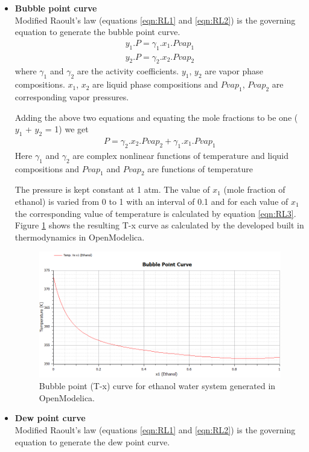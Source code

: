 \documentclass[12pt]{report}
\begin{document}
\begin{itemize}
\item {\textbf{Bubble point curve}} \\
Modified Raoult's law (equations \ref{eqn:RL1} and \ref{eqn:RL2}) is the governing equation to generate the bubble point curve.
\begin{gather}
y_1.P = \gamma_1.x_1.Pvap_1 \label{eqn:RL1}\\
y_2.P = \gamma_2.x_2.Pvap_2 \label{eqn:RL2} 
\end{gather}
where $\gamma_1$ and $\gamma_2$ are the activity coefficients. $y_1$, $y_2$ are vapor phase compositions. $x_1$, $x_2$ are liquid phase compositions and $Pvap_1$, $Pvap_2$ are corresponding vapor pressures.

Adding the above two equations and equating the mole fractions to be one ($y_1$ + $y_2$ = 1) we get
\begin{gather} 
P = \gamma_2.x_2.Pvap_2 + \gamma_1.x_1.Pvap_1 \label{eqn:RL3} 
\end{gather}
Here $\gamma_1$ and $\gamma_2$ are complex nonlinear functions of temperature and liquid compositions and $Pvap_1$ and $Pvap_2$ are functions of temperature

The pressure is kept constant at 1 atm. The value of $x_1$ (mole fraction of ethanol) is varied from 0 to 1 with an interval of 0.1 and for each value of $x_1$ the corresponding value of temperature is calculated by equation \ref{eqn:RL3}. Figure \ref{fig:BP} shows the resulting T-x curve as calculated by the developed built in thermodynamics in OpenModelica.

\begin{figure}[t]
\centering
\includegraphics[width=0.8\linewidth]{BP}
\caption{Bubble point (T-x) curve for ethanol water system generated in OpenModelica.}
\label{fig:BP}
\end{figure}

\item {\textbf{Dew point curve}} \\
Modified Raoult's law (equations \ref{eqn:RL1} and \ref{eqn:RL2}) is the governing equation to generate the dew point curve.


\end{itemize}
\end{document}
